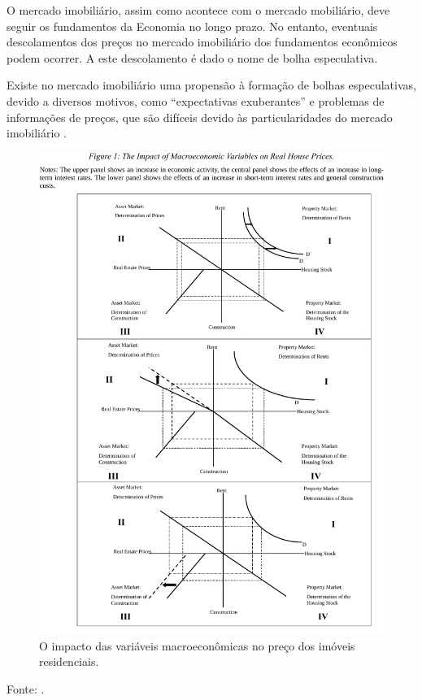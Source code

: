 \documentclass[
	12pt,				%
	oneside,			%
	a4paper,			%
	chapter=TITLE,		%
	section=TITLE,		%
	english,			%
	brazil				%
	]{abntex2}
\newcommand{\bcenter}{\begin{center}}
\newcommand{\ecenter}{\end{center}}
\begin{document}
O mercado imobiliário, assim como acontece com o mercado mobiliário,
deve seguir os fundamentos da Economia no longo prazo. No entanto,
eventuais descolamentos dos preços no mercado imobiliário dos
fundamentos econômicos podem ocorrer. A este descolamento é dado o nome
de bolha especulativa.

Existe no mercado imobiliário uma propensão à formação de bolhas
especulativas, devido a diversos motivos, como ``expectativas
exuberantes'' e problemas de informações de preços, que são difíceis
devido às particularidades do mercado imobiliário
\autocite[3]{ADAMS201038}.
\begin{figure}[H]

{\centering \includegraphics[width=\textwidth]{./images/adams_crop} 

}

\caption{O impacto das variáveis macroeconômicas no preço dos imóveis residenciais.}\label{fig:adams}
\end{figure}
\bcenter
Fonte: \textcite{ADAMS201038}. \ecenter
\end{document}
